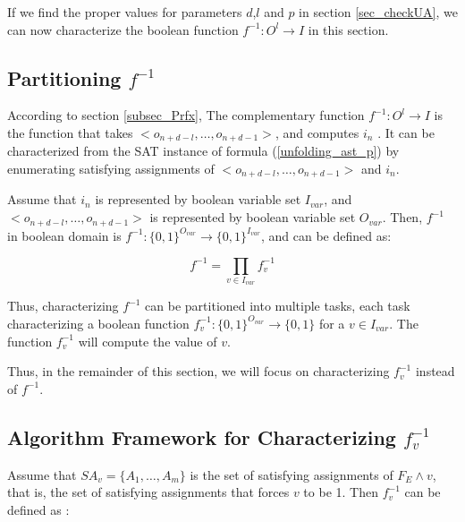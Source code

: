 \documentclass[journal]{IEEEtran}
\begin{document}
If we find the proper values for parameters $d$,$l$ and $p$ in section \ref{sec_checkUA},
we can now characterize the boolean function $f^{-1}:O^l\to I$ in this section.

\subsection{Partitioning $f^{-1}$}

According to section \ref{subsec_Prfx},
The complementary function $f^{-1}:O^l\to I$ is the function that takes $<o_{n+d-l},\dots , o_{n+d-1} >$,
and computes $i_n$ .
It can be characterized from the SAT instance of formula (\ref{unfolding_ast_p})
by enumerating satisfying assignments of $<o_{n+d-l},\dots , o_{n+d-1} >$ and $i_n$.

Assume that $i_n$ is represented by boolean variable set $I_{var}$,
and $<o_{n+d-l},\dots , o_{n+d-1} >$ is represented by boolean variable set $O_{var}$.
Then,
$f^{-1}$ in boolean domain is $f^{-1}:\{0,1\}^{O_{var}}\to \{0,1\}^{I_{var}}$,
and can be defined as:

\begin{equation}
f^{-1}= \prod _{v\in I_{var}} f_v^{-1}
\end{equation}

Thus,
characterizing $f^{-1}$ can be partitioned into multiple tasks,
each task characterizing a boolean function $f^{-1}_v: \{0,1\}^{O_{var}}\to \{0,1\}$ for a $v\in I_{var}$.
The function $f^{-1}_v$ will compute the value of $v$.

Thus,
in the remainder of this section,
we will focus on characterizing $f^{-1}_v$ instead of $f^{-1}$.

\subsection{Algorithm Framework for Characterizing $f^{-1}_v$}
%
Assume that $SA_v=\{A_1,\dots,A_m\}$ is the set of satisfying assignments of $F_E\wedge v$,
that is,
the set of satisfying assignments that forces $v$ to be 1.
Then $f^{-1}_v$ can be defined as :
\end{document}
